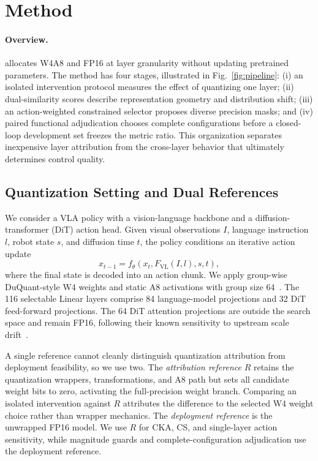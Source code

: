 \section{Method}
\label{sec:method}

\paragraph{Overview.}
\method allocates W4A8 and FP16 at layer granularity without updating pretrained parameters. The method has four stages, illustrated in Fig.~\ref{fig:pipeline}: (i) an isolated intervention protocol measures the effect of quantizing one layer; (ii) dual-similarity scores describe representation geometry and distribution shift; (iii) an action-weighted constrained selector proposes diverse precision masks; and (iv) paired functional adjudication chooses complete configurations before a closed-loop development set freezes the metric ratio. This organization separates inexpensive layer attribution from the cross-layer behavior that ultimately determines control quality.



\subsection{Quantization Setting and Dual References}
\label{sec:setting}

We consider a VLA policy with a vision-language backbone and a diffusion-transformer (DiT) action head. Given visual observations $I$, language instruction $l$, robot state $s$, and diffusion time $t$, the policy conditions an iterative action update
\begin{equation}
    x_{t-1}=f_{\theta}(x_t, F_{\mathrm{VL}}(I,l),s,t),
    \label{eq:vla}
\end{equation}
where the final state is decoded into an action chunk. We apply group-wise DuQuant-style W4 weights and static A8 activations with group size 64~\cite{lin2024duquant}. The 116 selectable Linear layers comprise 84 language-model projections and 32 DiT feed-forward projections. The 64 DiT attention projections are outside the search space and remain FP16, following their known sensitivity to upstream scale drift~\cite{zhang2026quantvla}.

A single reference cannot cleanly distinguish quantization attribution from deployment feasibility, so we use two. The \emph{attribution reference} $R$ retains the quantization wrappers, transformations, and A8 path but sets all candidate weight bits to zero, activating the full-precision weight branch. Comparing an isolated intervention against $R$ attributes the difference to the selected W4 weight choice rather than wrapper mechanics. The \emph{deployment reference} is the unwrapped FP16 model. We use $R$ for CKA, CS, and single-layer action sensitivity, while magnitude guards and complete-configuration adjudication use the deployment reference.

